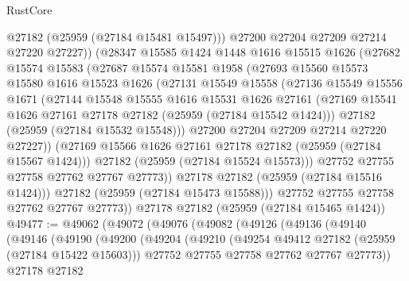 \begin{lexlean}{RustCore}
\begin{coremodule}
                @27182
                (@25959 (@27184 @15481 @15497)))
              @27200
              @27204
              @27209
              @27214
              @27220
              @27227))
          (@28347
            @15585
            @1424
            @1448
            @1616
            @15515
            @1626
            (@27682
              @15574
              @15583
              (@27687
                @15574
                @15581
                @1958
                (@27693
                  @15560
                  @15573
                  @15580
                  @1616
                  @15523
                  @1626
                  (@27131
                    @15549
                    @15558
                    (@27136
                      @15549
                      @15556
                      @1671
                      (@27144
                        @15548
                        @15555
                        @1616
                        @15531
                        @1626
                        @27161
                        (@27169 @15541 @1626 @27161 @27178 @27182 (@25959 (@27184 @15542 @1424)))
                        @27182
                        (@25959 (@27184 @15532 @15548)))
                      @27200
                      @27204
                      @27209
                      @27214
                      @27220
                      @27227))
                  (@27169 @15566 @1626 @27161 @27178 @27182 (@25959 (@27184 @15567 @1424)))
                  @27182
                  (@25959 (@27184 @15524 @15573)))
                @27752
                @27755
                @27758
                @27762
                @27767
                @27773))
            @27178
            @27182
            (@25959 (@27184 @15516 @1424)))
          @27182
          (@25959 (@27184 @15473 @15588)))
        @27752
        @27755
        @27758
        @27762
        @27767
        @27773))
    @27178
    @27182
    (@25959 (@27184 @15465 @1424))
@49477 := @49062
    (@49072
      (@49076
        (@49082
          (@49126
            (@49136
              (@49140
                (@49146
                  (@49190
                    (@49200
                      (@49204
                        (@49210
                          (@49254 @49412 @27182 (@25959 (@27184 @15422 @15603)))
                          @27752
                          @27755
                          @27758
                          @27762
                          @27767
                          @27773))
                      @27178
                      @27182

\end{coremodule}
\end{lexlean}
